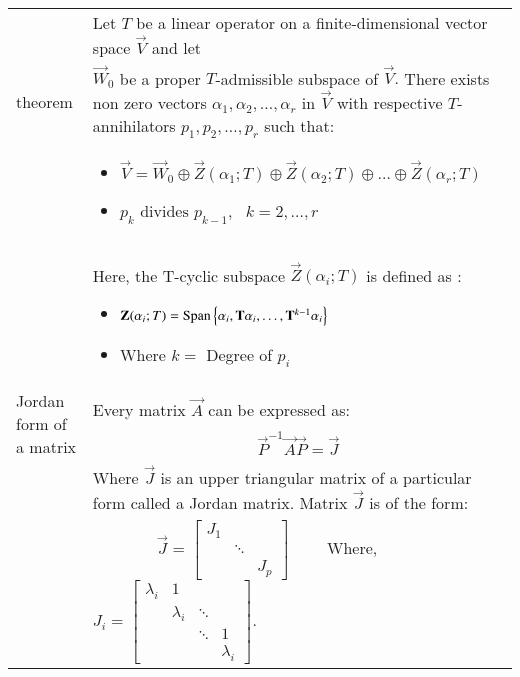 \documentclass[journal,12pt]{IEEEtran}
\begin{document}
\begin{longtable}{|p{4.5cm}|p{13.5cm}|}
	&Let $T$ be a linear operator on a finite-dimensional vector space $\vec{V}$ and let\\theorem
	&$\vec{W}_0$ be a proper $T$-admissible subspace of $\vec{V}.$ There exists non zero vectors $\alpha_1,\alpha_2,\hdots,\alpha_r$ in $\vec{V}$ with respective $T$-annihilators $p_1,p_2,\hdots,p_r$ such that:\\
	&\begin{itemize}
        \item $\vec{V}=\vec{W}_0\oplus \vec{Z}(\alpha_1;T)\oplus \vec{Z}(\alpha_2;T)\oplus\hdots\oplus \vec{Z}(\alpha_r;T)$
        \item $p_k \text{ divides } p_{k-1},\text{ }k=2, \hdots,r$
    \end{itemize}\\
	&Here, the T-cyclic subspace $ \vec{Z}(\alpha_i;T)$ is defined as :
	\begin{itemize}
	    \item $\mathbf{Z}(\alpha_i;T)=\text{Span}\left\{\alpha_i,\mathbf{T}\alpha_i,\hdots,\mathbf{T}^{k-1}\alpha_i\right\}$
	    \item Where $k=$ Degree of $p_i$
	\end{itemize}\\
	\hline
    \multirow{3}{*}{Jordan form of a matrix} & \\
	&Every matrix $\vec{A}$ can be expressed as:\\
	&\begin{align}
	    \vec{P}^{-1}\vec{A}\vec{P} = \vec{J}
	\end{align}\\
	&Where $\vec{J}$ is an upper triangular matrix of a particular form called a Jordan matrix. Matrix $\vec{J}$ is of the form:\\
	&$\qquad\qquad \vec{J} = \begin{bmatrix}
J_1 & \;     & \; \\
\;  & \ddots & \; \\ 
\;  & \;     & J_p\end{bmatrix}\qquad$ Where, $J_i = 
\begin{bmatrix}
\lambda_i & 1            & \;     & \;  \\
\;        & \lambda_i    & \ddots & \;  \\
\;        & \;           & \ddots & 1   \\
\;        & \;           & \;     & \lambda_i       
\end{bmatrix}.$\\
\end{longtable}
\end{document}
